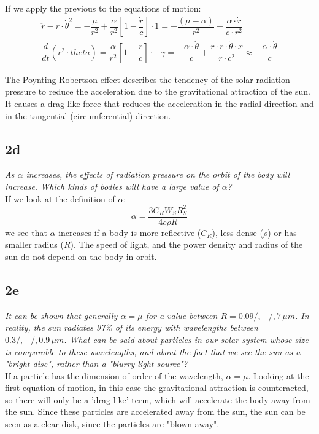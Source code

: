 If we apply the previous to the equations of motion: 
\begin{equation}
\begin{split}
    \ddot {r}-r\cdot \dot{\theta} ^{2}=-\dfrac {\mu }{r^{2}}+\dfrac {\alpha }{r^{2}}\left[ 1-\dfrac {\dot{r}}{c}\right] \cdot 1 = -\dfrac {\left( \mu -\alpha \right) }{r^{2}}-\dfrac {\alpha \cdot \dot{r}}{c\cdot r^{2}} \\
    \dfrac {d}{dt}\left( r^{2}\cdot \dot{theta} \right) =\dfrac {\alpha }{r^{2}}\left[ 1-\dfrac {\dot{r}}{c}\right] \cdot -\gamma  = -\dfrac {\alpha \cdot \dot{\theta} }{c}+\dfrac {\dot{r}\cdot r\cdot \dot{\theta} \cdot x}{r\cdot c^{2}} \approx -\dfrac {\alpha \cdot \dot{\theta} }{c}
\end{split}
\end{equation}

The Poynting-Robertson effect describes the tendency of the solar radiation pressure to reduce the acceleration due to the gravitational attraction of the sun. It causes a drag-like force that reduces the acceleration in the radial direction and in the tangential (circumferential) direction.  


\subsection{2d}
\textit{As $\alpha$ increases, the effects of radiation pressure on the orbit of the body will increase. Which kinds of bodies will have a large value of $\alpha$?} \\
If we look at the definition of $\alpha$:
\begin{equation}
    \alpha = \frac{3 C_R W_S R_S^2}{4 c \rho R}
\end{equation}
we see that $\alpha$ increases if a body is more reflective ($C_R$), less dense ($\rho$) or has smaller radius ($R$). The speed of light, and the power density and radius of the sun do not depend on the body in orbit.



\subsection{2e}
\textit{It can be shown that generally $\alpha = \mu$ for a value between $R=0.09 /, - /, 7 \, \mu m$. In reality, the sun radiates 97\% of its energy with wavelengths between $0.3 /, - /, 0.9 \, \mu m$. What can be said about particles in our solar system whose size is comparable to these wavelengths, and about the fact that we see the sun as a "bright disc", rather than a "blurry light source"?} \\

If a particle has the dimension of order of the wavelength, $\alpha = \mu$. Looking at the first equation of motion, in this case the gravitational attraction is counteracted, so there will only be a 'drag-like' term, which will accelerate the body away from the sun.
Since these particles are accelerated away from the sun, the sun can be seen as a clear disk, since the particles are "blown away".
